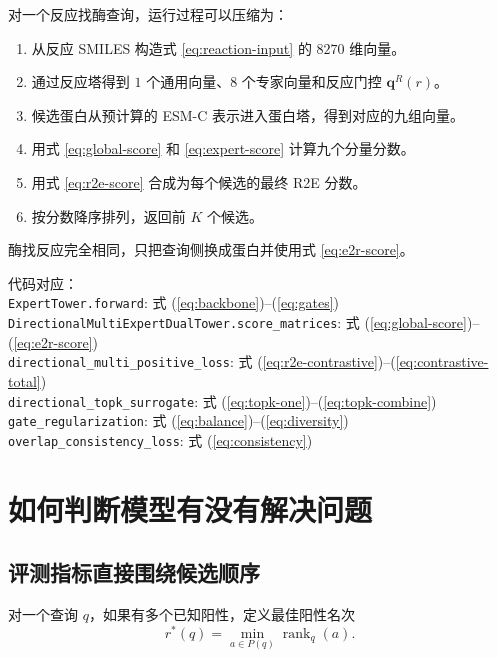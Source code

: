 \documentclass[UTF8,11pt,a4paper]{ctexart}
\newcommand{\rank}{\operatorname{rank}}
\begin{document}
对一个反应找酶查询，运行过程可以压缩为：

\begin{enumerate}[label=\textbf{Step \arabic*.}]
\item 从反应 SMILES 构造式 \eqref{eq:reaction-input} 的 $8270$ 维向量。
\item 通过反应塔得到 $1$ 个通用向量、$8$ 个专家向量和反应门控 $\bm q^R(r)$。
\item 候选蛋白从预计算的 ESM-C 表示进入蛋白塔，得到对应的九组向量。
\item 用式 \eqref{eq:global-score} 和 \eqref{eq:expert-score} 计算九个分量分数。
\item 用式 \eqref{eq:r2e-score} 合成为每个候选的最终 R2E 分数。
\item 按分数降序排列，返回前 $K$ 个候选。
\end{enumerate}

酶找反应完全相同，只把查询侧换成蛋白并使用式 \eqref{eq:e2r-score}。

\begin{codebox}
代码对应：\\
\texttt{ExpertTower.forward}: 式 (\ref{eq:backbone})--(\ref{eq:gates})\\
\texttt{DirectionalMultiExpertDualTower.score\_matrices}: 式 (\ref{eq:global-score})--(\ref{eq:e2r-score})\\
\texttt{directional\_multi\_positive\_loss}: 式 (\ref{eq:r2e-contrastive})--(\ref{eq:contrastive-total})\\
\texttt{directional\_topk\_surrogate}: 式 (\ref{eq:topk-one})--(\ref{eq:topk-combine})\\
\texttt{gate\_regularization}: 式 (\ref{eq:balance})--(\ref{eq:diversity})\\
\texttt{overlap\_consistency\_loss}: 式 (\ref{eq:consistency})
\end{codebox}

\section{如何判断模型有没有解决问题}

\subsection{评测指标直接围绕候选顺序}

对一个查询 $q$，如果有多个已知阳性，定义最佳阳性名次
\begin{equation}
r^*(q)=\min_{a\in P(q)}\rank_q(a).
\label{eq:best-rank}
\end{equation}
\end{document}
